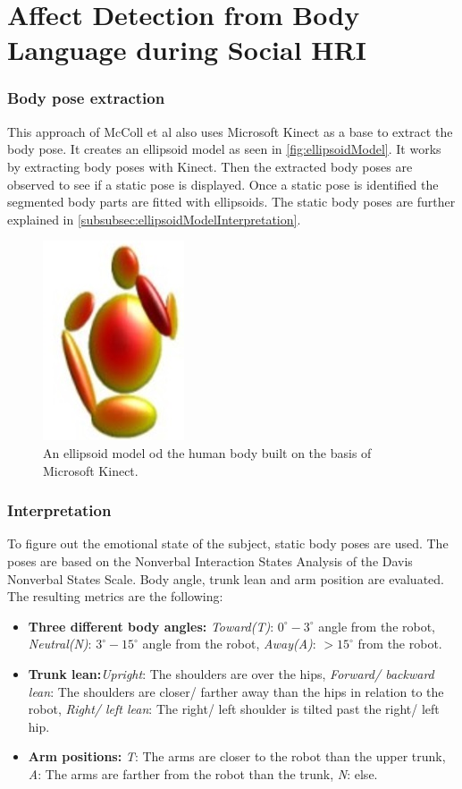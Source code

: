 \documentclass[conference]{IEEEtran}
\begin{document}
\section{Affect Detection from Body Language during Social HRI}
\subsubsection{Body pose extraction}
This approach of McColl et al\cite{mccoll2012affect} also uses Microsoft Kinect as a base to extract the body pose. It creates an ellipsoid model as seen in \autoref{fig:ellipsoidModel}. It works by extracting body poses with Kinect. Then the extracted body poses are observed to see if a static pose is displayed. Once a static pose is identified the segmented body parts are fitted with ellipsoids. The static body poses are further explained in \autoref{subsubsec:ellipsoidModelInterpretation}.

\begin{figure}[H]
\centering
\includegraphics[scale=0.5]{ellipsoidModel.jpg}
\caption{An ellipsoid model od the human body built on the basis of Microsoft Kinect.\cite{singh2015edbl}}
\label{fig:ellipsoidModel}
\end{figure}

\subsubsection{Interpretation} 
\label{subsubsec:ellipsoidModelInterpretation}
To figure out the emotional state of the subject, static body poses are used. The poses are based on the Nonverbal Interaction States Analysis of the Davis Nonverbal States Scale\cite{davis1994nonverbal}. Body angle, trunk lean and arm position are evaluated. The resulting metrics are the following: 
\begin{itemize}
\item{\textbf{Three different body angles:} \emph{Toward(T)}: $0^{\circ}-3^{\circ}$ angle from the robot, \emph{Neutral(N)}: $3^{\circ}-15^{\circ}$ angle from the robot, \emph{Away(A)}:  $>15^{\circ}$ from the robot.}
\item{\textbf{Trunk lean:}\emph{Upright}: The shoulders are over the hips, \emph{Forward/ backward lean}: The shoulders are closer/ farther away than the hips in relation to the robot, \emph{Right/ left lean}: The right/ left shoulder is tilted past the right/ left hip.}
\item{\textbf{Arm positions:} \emph{T}: The arms are closer to the robot than the upper trunk, \emph{A}: The arms are farther from the robot than the trunk, \emph{N}: else.}
\end{itemize}
\end{document}
